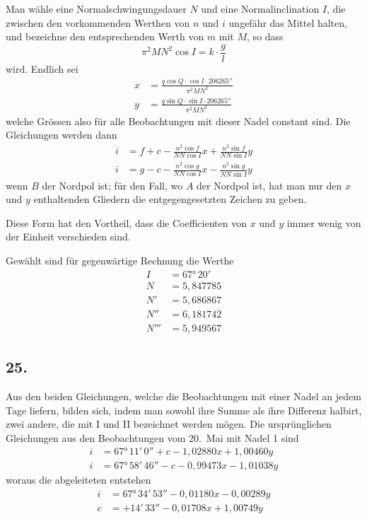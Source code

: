 \documentclass[12pt,a4paper]{article}
\begin{document}
Man wähle eine Normalschwingungsdauer $N$ und eine Normalinclination $I$, die zwischen den vorkommenden Werthen von $n$ und $i$ ungefähr das Mittel halten, und bezeichne den entsprechenden Werth von $m$ mit $M$, so dass
\[ \pi^2 M N^2 \cos I = k \cdot \frac{g}{l} \]
wird. Endlich sei
\begin{align*}
x &= \frac{q \cos Q \cdot \cos I \cdot 206265''}{\pi^2 M N^2} \\
y &= \frac{q \sin Q \cdot \sin I \cdot 206265''}{\pi^2 M N^2}
\end{align*}
welche Grössen also für alle Beobachtungen mit dieser Nadel constant sind. Die Gleichungen werden dann
\begin{align*}
i &= f + c - \frac{n^2 \cos f}{N N \cos I} x + \frac{n^2 \sin f}{N N \sin I} y \\
i &= g - c - \frac{n^2 \cos g}{N N \cos I} x - \frac{n^2 \sin g}{N N \sin I} y
\end{align*}
wenn $B$ der Nordpol ist; für den Fall, wo $A$ der Nordpol ist, hat man nur den $x$ und $y$ enthaltenden Gliedern die entgegengesetzten Zeichen zu geben.

Diese Form hat den Vortheil, dass die Coefficienten von $x$ und $y$ immer wenig von der Einheit verschieden sind.

Gewählt sind für gegenwärtige Rechnung die Werthe
\begin{align*}
I &= 67°\,20' \\
N &= 5{,}847785 \\
N' &= 5{,}686867 \\
N'' &= 6{,}181742 \\
N''' &= 5{,}949567
\end{align*}

\subsection*{25.}
Aus den beiden Gleichungen, welche die Beobachtungen mit einer Nadel an jedem Tage liefern, bilden sich, indem man sowohl ihre Summe als ihre Differenz halbirt, zwei andere, die mit I und II bezeichnet werden mögen. Die ursprünglichen Gleichungen aus den Beobachtungen vom 20.~Mai mit Nadel 1 sind
\begin{align*}
i &= 67°\,11'\,0'' + c - 1{,}02880 x + 1{,}00460 y \\
i &= 67°\,58'\,46'' - c - 0{,}99473 x - 1{,}01038 y
\end{align*}
woraus die abgeleiteten entstehen
\begin{align*}
i &= 67°\,34'\,53'' - 0{,}01180 x - 0{,}00289 y \\
c &= +14'\,33'' - 0{,}01708 x + 1{,}00749 y \tag{II}
\end{align*}
\end{document}
